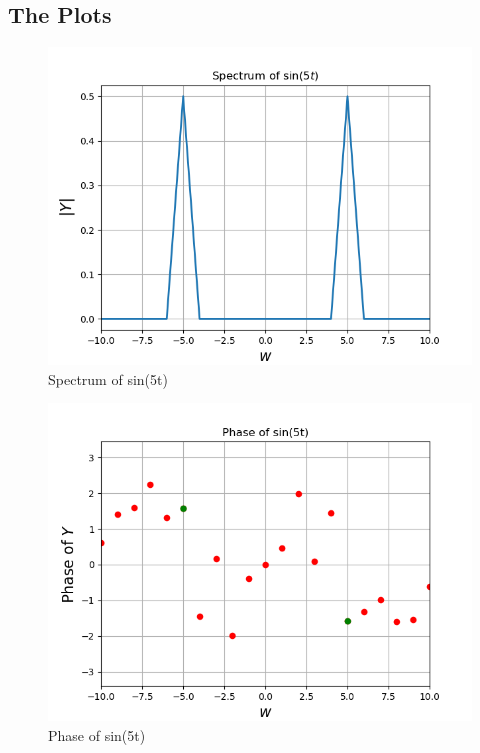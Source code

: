 \documentclass[11pt]{article}
\begin{document}
\subsection{The Plots}
\begin{figure}[H]
    \centering
    \includegraphics[scale = 0.75]{Figure_1a.png}
    \caption{Spectrum of sin(5t)}
\end{figure}
\begin{figure}[H]
    \centering
    \includegraphics[scale = 0.75]{Figure_1b.png}
    \caption{Phase of sin(5t)}
\end{figure}
\end{document}

